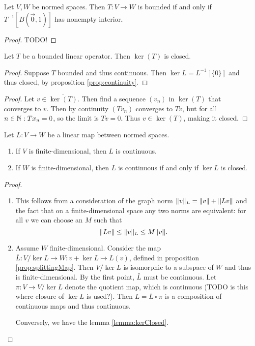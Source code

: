 \begin{proposition}
Let $V,W$ be normed spaces. Then $T:V\to W$ is bounded \textup{if and only if}
$T^{-1}[B(\vec{0},1)]$ has nonempty interior.
\end{proposition}
\begin{proof}
TODO!
\end{proof}

\begin{lemma} \label{lemma:kerClosed}
Let $T$ be a bounded linear operator. Then $\ker(T)$ is closed.
\end{lemma}
\begin{proof}
Suppose $T$ bounded and thus continuous. Then $\ker L = L^{-1}[\{0\}]$ and thus closed, by proposition \ref{prop:continuity}.
\end{proof}
\begin{proof}
Let $v\in \overline{\ker(T)}$. Then find a sequence $(v_n)$ in $\ker(T)$ that converges to $v$. Then by continuity $(Tv_n)$ converges to $Tv$, but for all $n\in\mathbb{N}: Tx_n = 0$, so the limit is $Tv=0$. Thus $v\in\ker(T)$, making it closed.
\end{proof}

\begin{proposition}\label{prop:continuousMapCriterion}
Let $L:V\to W$ be a linear map between normed spaces.
\begin{enumerate}
\item If $V$ is finite-dimensional, then $L$ is continuous.
\item If $W$ is finite-dimensional, then $L$ is continuous \textup{if and only if} $\ker L$ is closed.
\end{enumerate}
\end{proposition}
\begin{proof}
\begin{enumerate}
\item This follows from a consideration of the graph norm $\lVert v\rVert_L = \lVert v\rVert+\lVert Lv\rVert$ and the fact that on a finite-dimensional space any two norms are equivalent: for all $v$ we can choose an $M$ such that
\[ \lVert Lv\rVert\leq \lVert v\rVert_L \leq M\lVert v\rVert. \]
\item Assume $W$ finite-dimensional. Consider the map $\bar{L}:V/\ker L\to W: v+\ker{L}\mapsto L(v)$, defined in proposition \ref{prop:splittingMap}. Then $V/\ker L$ is isomorphic to a subspace of $W$ and thus is finite-dimensional. By the first point, $\bar{L}$ must be continuous. Let $\pi: V\to V/\ker L$ denote the quotient map, which is continuous (TODO is this where closure of $\ker L$ is used?). Then $L = \bar{L}\circ \pi$ is a composition of continuous maps and thus continuous.

Conversely, we have the lemma \ref{lemma:kerClosed}.
\end{enumerate}
\end{proof}

